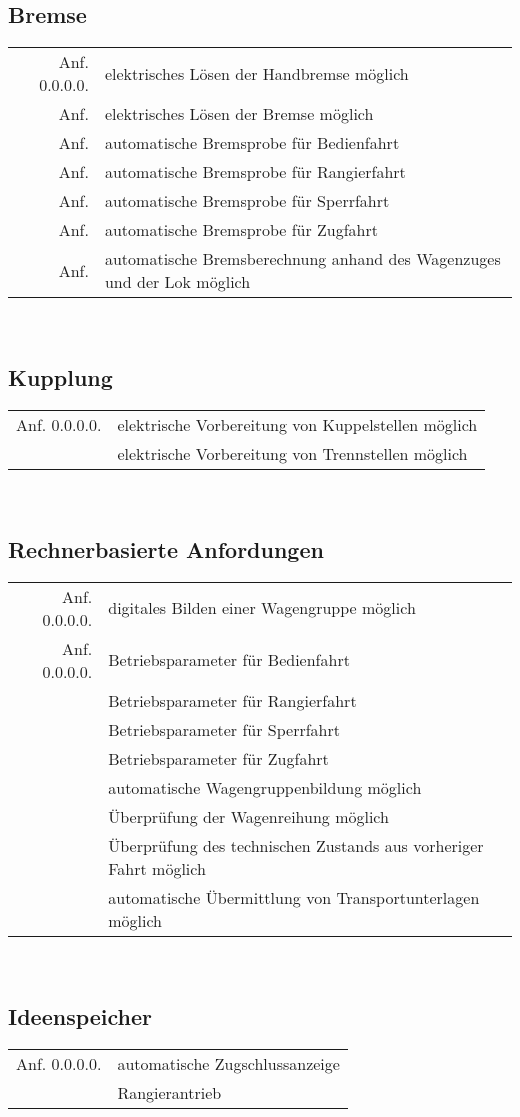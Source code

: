 \subsection{Bremse}
\begin{tabular}{r|l}
	\hline
	Anf. 0.0.0.0.	&	elektrisches Lösen der Handbremse möglich 	\\
	Anf.			&	elektrisches Lösen der Bremse möglich		\\
	Anf.			&	automatische Bremsprobe für Bedienfahrt		\\
	Anf.			&	automatische Bremsprobe für Rangierfahrt	\\
	Anf.			&	automatische Bremsprobe für Sperrfahrt		\\
	Anf.			&	automatische Bremsprobe für Zugfahrt		\\
	Anf.			&	automatische Bremsberechnung anhand des Wagenzuges und der Lok möglich		\\
	
	\hline
\end{tabular} \\
\subsection{Kupplung}
\begin{tabular}{r|l}
	\hline
	Anf. 0.0.0.0.	&	elektrische Vorbereitung von Kuppelstellen möglich\\
					&	elektrische Vorbereitung von Trennstellen möglich\\
	\hline
\end{tabular}\\
\subsection{Rechnerbasierte Anfordungen}
\begin{tabular}{r|l}
	\hline
	Anf. 0.0.0.0.	&	digitales Bilden einer Wagengruppe möglich	\\
	Anf. 0.0.0.0.	&	Betriebsparameter für Bedienfahrt			\\
					&	Betriebsparameter für Rangierfahrt			\\
					&	Betriebsparameter für Sperrfahrt			\\
					&	Betriebsparameter für Zugfahrt				\\
					&	automatische Wagengruppenbildung möglich	\\
					&	Überprüfung der Wagenreihung möglich		\\
					&	Überprüfung des technischen Zustands aus vorheriger Fahrt möglich\\
					&	automatische Übermittlung von Transportunterlagen möglich\\
	\hline
\end{tabular}\\
\subsection{Ideenspeicher}
\begin{tabular}{r|l}
	\hline
	Anf. 0.0.0.0.	&	automatische Zugschlussanzeige				\\
					&	Rangierantrieb								\\
	\hline
\end{tabular}